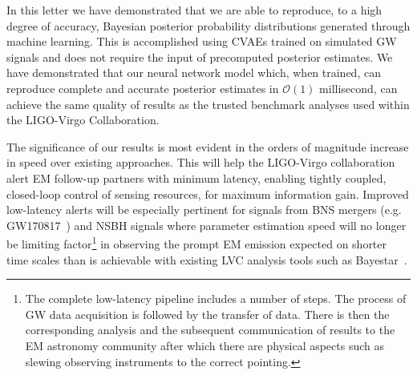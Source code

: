 \documentclass[%
showpacs,
 amsmath,amssymb,
 aps,
 twocolumn,
 prl,
 reprint,
floatfix,
]{revtex4-1}
\begin{document}
%
%
%
In this letter we have demonstrated that we are able to reproduce, to a high
degree of accuracy, Bayesian posterior probability distributions generated
through machine learning. This is accomplished using \acp{CVAE} trained on
simulated \ac{GW} signals and does not require the input of precomputed
posterior estimates. We have demonstrated that our neural network model which,
when trained, can reproduce complete and accurate posterior estimates in
$\mathcal{O}(1)$ millisecond, can achieve the same quality of results as the
trusted benchmark analyses used within the LIGO-Virgo Collaboration.

%
%
The significance of our results is most evident in the orders of magnitude
increase in speed over existing approaches. This will help the
LIGO-Virgo collaboration alert \ac{EM} follow-up partners with minimum latency, 
enabling tightly coupled, closed-loop control of sensing resources, for maximum information gain.
Improved low-latency alerts will be especially pertinent for signals from
\ac{BNS} mergers (e.g. GW170817~\cite{PhysRevLett.119.161101}) and \ac{NSBH} signals where
parameter estimation speed will no longer be limiting factor\footnote{The complete
low-latency pipeline includes a number of steps. The process of \ac{GW} data
acquisition is followed by the transfer of data. There is then the corresponding
analysis and the subsequent communication of results to the \ac{EM} astronomy
community after which there are physical aspects such as slewing observing
instruments to the correct pointing.} in observing the prompt \ac{EM} emission
expected on shorter time scales than is achievable with existing \ac{LVC}
analysis tools such as Bayestar~\cite{2016PhRvD..93b4013S}.
\end{document}
